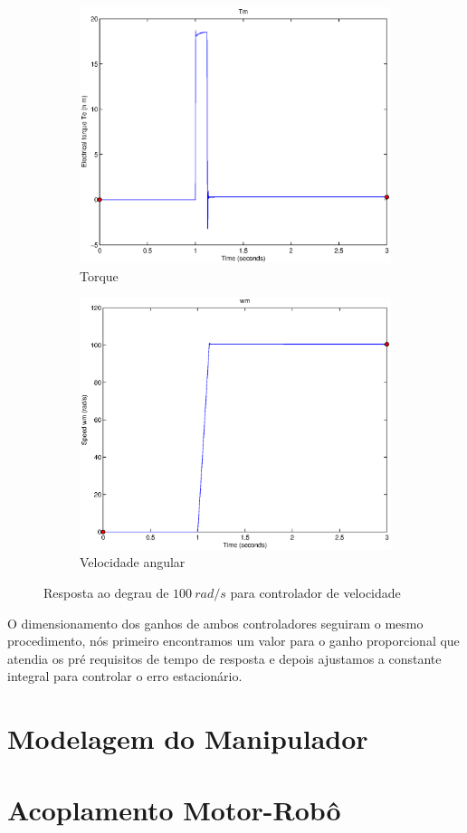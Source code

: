 \documentclass{article}
\begin{document}
\begin{figure}[H]
\begin{subfigure}{0.45\textwidth}
		\includegraphics[width=\linewidth]{matlab/tm3}
		\caption{Torque}
	\end{subfigure}
	\begin{subfigure}{0.45\textwidth}
		\includegraphics[width=\linewidth]{matlab/wm3}
		\caption{Velocidade angular}
	\end{subfigure}
	\caption{Resposta ao degrau de $100\ rad/s$ para controlador de velocidade}	
	\label{fig:sim3viwt}
\end{figure}

O dimensionamento dos ganhos de ambos controladores seguiram o mesmo procedimento, nós primeiro encontramos um valor para o ganho proporcional que atendia os pré requisitos de tempo de resposta e depois ajustamos a constante integral para controlar o erro estacionário.

\section{Modelagem do Manipulador}
\section{Acoplamento Motor-Robô}



\end{document}
